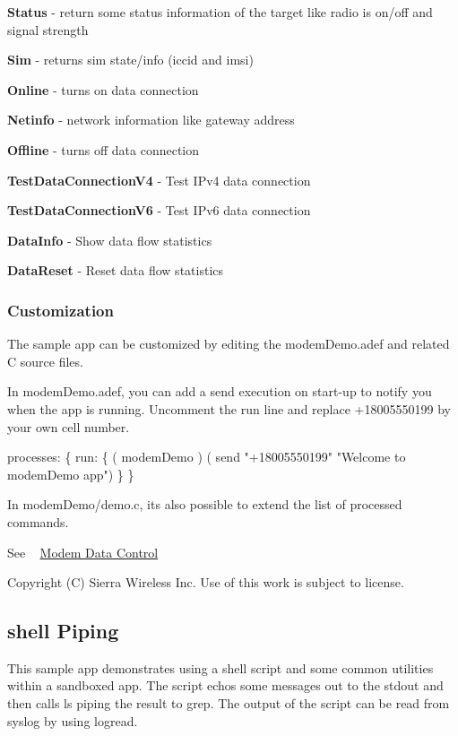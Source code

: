 \begin{DoxyItemize}
\item {\bfseries Status} -\/ return some status information of the target like radio is on/off and signal strength
\item {\bfseries Sim} -\/ returns sim state/info (iccid and imsi)
\item {\bfseries Online} -\/ turns on data connection
\item {\bfseries Netinfo} -\/ network information like gateway address
\item {\bfseries Offline} -\/ turns off data connection
\item {\bfseries Test\+Data\+Connection\+V4} -\/ Test I\+Pv4 data connection
\item {\bfseries Test\+Data\+Connection\+V6} -\/ Test I\+Pv6 data connection
\item {\bfseries Data\+Info} -\/ Show data flow statistics
\item {\bfseries Data\+Reset} -\/ Reset data flow statistics
\end{DoxyItemize}\hypertarget{sample_apps_modem_demo_sampleApps_modemDemoCustom}{}\subsubsection{Customization}\label{sample_apps_modem_demo_sampleApps_modemDemoCustom}
The sample app can be customized by editing the {\ttfamily modem\+Demo.\+adef} and related C source files.

In {\ttfamily modem\+Demo.\+adef}, you can add a {\ttfamily send} execution on start-\/up to notify you when the app is running. Uncomment the {\ttfamily run} line and replace {\ttfamily +18005550199} by your own cell number.


\begin{DoxyCode}
processes:
\{
    run:
    \{
        ( modemDemo )
        ( send \textcolor{stringliteral}{"+18005550199"} \textcolor{stringliteral}{"Welcome to modemDemo app"})
    \}
\}
\end{DoxyCode}


In {\ttfamily modem\+Demo/demo.\+c}, it\textquotesingle{}s also possible to extend the list of processed commands.

See ~\newline
 \hyperlink{c_mdc}{Modem Data Control}





Copyright (C) Sierra Wireless Inc. Use of this work is subject to license. \hypertarget{sampleApps_shellPiping}{}\subsection{shell Piping}\label{sampleApps_shellPiping}
This sample app demonstrates using a shell script and some common utilities within a sandboxed app. The script echos some messages out to the stdout and then calls \textquotesingle{}ls\textquotesingle{} piping the result to \textquotesingle{}grep\textquotesingle{}. The output of the script can be read from syslog by using \textquotesingle{}logread\textquotesingle{}.


